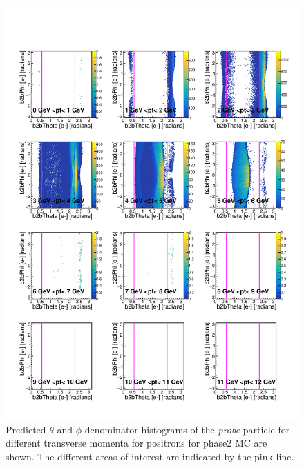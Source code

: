 \documentclass[a4paper,11pt,twosided,final,german,openbib,pdftex,listof=totoc,bibliography=totoc]{scrbook}
\begin{document}
\begin{appendix}
\begin{figure}[h!]
	\includegraphics[width=\textwidth]{Plots/RTPtMepD_MC.pdf}
	\caption[Denominator $\theta$-$\phi$ Positron Transverse Momentum Phase2 MC]{Predicted $\theta$ and $\phi$ denominator histograms of the \textit{probe} particle for different transverse momenta for positrons for phase2 MC are shown. The different areas of interest are indicated by the pink line.}
	\label{plt:RTPtMepD_MC}
\end{figure}




\end{appendix}
\end{document}
